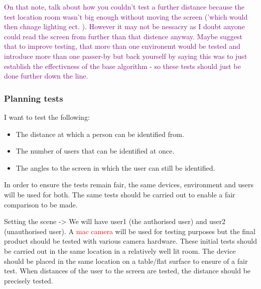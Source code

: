 \documentclass[12pt]{article}
\theoremstyle{plain}
\theoremstyle{definition}
\begin{document}
\textcolor{purple}{On that note, talk about how you couldn't test a further distance because the test location room wasn't big enough without moving the screen ('which would then chnage lighting ect. ). However it may not be nessacry as I doubt anyone could read the screen from further than that distence anyway. Maybe suggest that to improve testing, that more than one environemt would be tested and introduce more than one passer-by but back yourself by saying this was to just establish the effectivness of the base algorithm - so these tests should just be done further down the line.}


\subsubsection{Planning tests}
I want to test the following:
\begin{itemize}
    \item The distance at which a person can be identified from.
    \item The number of users that can be identified at once.
    \item The angles to the screen in which the user can still be identified.
\end{itemize}
In order to ensure the tests remain fair, the same devices, environment and users will be used for both. The same tests should be carried out to enable a fair comparison to be made.

Setting the scene -> We will have user1 (the authorised user) and user2 (unauthorised user). A \textcolor{red}{mac camera} will be used for testing purposes but the final product should be tested with various camera hardware. These initial tests should be carried out in the same location in a relatively well lit room. The device should be placed in the same location on a table/flat surface to ensure of a fair test. When distances of the user to the screen are tested, the distance should be precisely tested.
\end{document}
